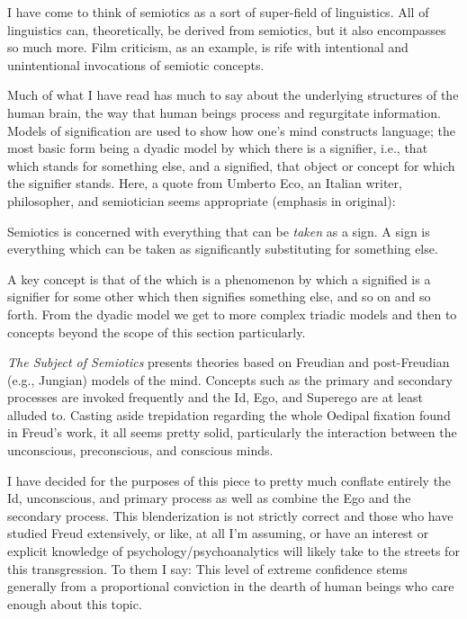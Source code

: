 \documentclass[../butidigress.tex]{subfiles}
\begin{document}
I have come to think of semiotics as a sort of super-field of linguistics.
All of linguistics can, theoretically, be derived from semiotics, but it also encompasses so much more.
Film criticism, as an example, is rife with intentional and unintentional invocations of semiotic concepts.

Much of what I have read has much to say about the underlying structures of the human brain, the way that human beings process and regurgitate information.
Models of signification are used to show how one's mind constructs language; the most basic form being a dyadic model by which there is a signifier, i.e., that which stands for something else, and a signified, that object or concept for which the signifier stands.
Here, a quote from Umberto Eco, an Italian writer, philosopher, and semiotician seems appropriate (emphasis in original):
\begin{displayquote}
Semiotics is concerned with everything that can be \emph{taken} as a sign.
A sign is everything which can be taken as significantly substituting for something else.\autocite{ecosemiotics}
\end{displayquote}

A key concept is that of the  which is a phenomenon by which a signified is a signifier for some other  which then signifies something else, and so on and so forth.
From the dyadic model we get to more complex triadic models and then to concepts beyond the scope of this section particularly.


\textit{The Subject of Semiotics} presents theories based on Freudian and post-Freudian (e.g., Jungian) models of the mind.
Concepts such as the primary and secondary processes are invoked frequently and the Id, Ego, and Superego are at least alluded to.
Casting aside trepidation regarding the whole Oedipal fixation found in Freud's work, it all seems pretty solid, particularly the interaction between the unconscious, preconscious, and conscious minds.

I have decided for the purposes of this piece to pretty much conflate entirely the Id, unconscious, and primary process as well as combine the Ego and the secondary process.
This blenderization is not strictly correct and those who have studied Freud extensively, or like, at all I'm assuming, or have an interest or explicit knowledge of psychology/psychoanalytics will likely take to the streets for this transgression.
To them I say: 
This level of extreme confidence stems generally from a proportional conviction in the dearth of human beings who care enough about this topic.
\end{document}
